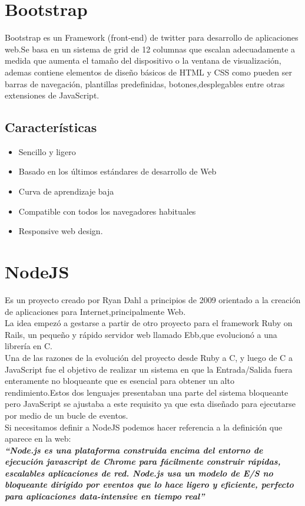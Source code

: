 \section{Bootstrap}
Bootstrap\cite{bootstrap}\cite{bootstrapOfi} es un Framework (front-end) de twitter para desarrollo de aplicaciones web.Se basa en un sistema de grid de 12 columnas que escalan adecuadamente a medida que aumenta el tamaño del dispositivo o la ventana de visualización, ademas contiene elementos de diseño básicos de HTML y CSS como pueden ser barras de navegación, plantillas predefinidas, botones,desplegables entre otras extensiones de JavaScript.
\subsection*{Características}
\begin{itemize}
\item Sencillo y ligero
\item Basado en los últimos estándares de desarrollo de Web
\item Curva de aprendizaje baja
\item Compatible con todos los navegadores habituales
\item Responsive web design.
\end{itemize}
\section{NodeJS}
Es un proyecto creado por Ryan Dahl a principios de 2009  orientado a la creación de aplicaciones para Internet,principalmente Web.
\\La idea empezó a gestarse a partir de otro proyecto para el framework Ruby on Rails, un pequeño y rápido servidor web llamado Ebb,que evolucionó a una librería en C.
\\Una de las razones de la evolución del proyecto desde Ruby a C, y luego de C a JavaScript fue el objetivo de realizar un sistema en que la Entrada/Salida fuera enteramente no bloqueante que es esencial para obtener un alto rendimiento.Estos dos lenguajes presentaban una parte del sistema bloqueante pero JavaScript se ajustaba a este requisito ya que esta diseñado para ejecutarse por medio de un bucle de eventos.
\\Si necesitamos definir a NodeJS\cite{nodejs} podemos hacer referencia a la definición que aparece en la web:\\
\textbf{\textit{“Node.js es una plataforma construida encima del entorno de ejecución javascript
de Chrome para fácilmente construir rápidas, escalables aplicaciones de red.
Node.js usa un modelo de E/S no bloqueante dirigido por eventos que lo hace ligero
y eficiente, perfecto para aplicaciones data-intensive en tiempo real”}}
